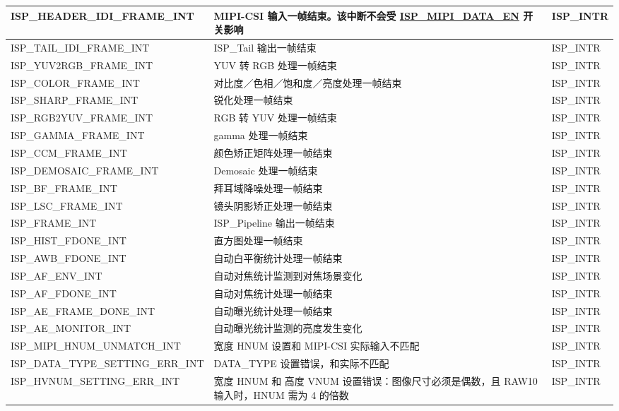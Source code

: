 \documentclass[main\_\_CN.tex]{subfiles}
\begin{document}
\begin{longtable}{ | L{5.6cm} | L{5.8cm} | L{3cm} | }
    ISP\_HEADER\_IDI\_FRAME\_INT & MIPI-CSI 输入一帧结束。该中断不会受 \hyperref[fielddesc:ISPMIPIDATAEN]{ISP\_MIPI\_DATA\_EN} 开关影响 & ISP\_INTR \\ \hline
    ISP\_TAIL\_IDI\_FRAME\_INT & ISP\_Tail 输出一帧结束 & ISP\_INTR \\ \hline
    ISP\_YUV2RGB\_FRAME\_INT & YUV 转 RGB 处理一帧结束 & ISP\_INTR \\ \hline
    ISP\_COLOR\_FRAME\_INT & 对比度／色相／饱和度／亮度处理一帧结束 & ISP\_INTR \\ \hline
    ISP\_SHARP\_FRAME\_INT & 锐化处理一帧结束 & ISP\_INTR \\ \hline
    ISP\_RGB2YUV\_FRAME\_INT & RGB 转 YUV 处理一帧结束 & ISP\_INTR \\ \hline
    ISP\_GAMMA\_FRAME\_INT & gamma 处理一帧结束 & ISP\_INTR \\ \hline
    ISP\_CCM\_FRAME\_INT & 颜色矫正矩阵处理一帧结束 & ISP\_INTR \\ \hline
    ISP\_DEMOSAIC\_FRAME\_INT & Demosaic 处理一帧结束 & ISP\_INTR \\ \hline
    ISP\_BF\_FRAME\_INT & 拜耳域降噪处理一帧结束 & ISP\_INTR \\ \hline
    ISP\_LSC\_FRAME\_INT & 镜头阴影矫正处理一帧结束 & ISP\_INTR \\ \hline
    ISP\_FRAME\_INT & ISP\_Pipeline 输出一帧结束 & ISP\_INTR \\ \hline
    ISP\_HIST\_FDONE\_INT & 直方图处理一帧结束 & ISP\_INTR \\ \hline
    ISP\_AWB\_FDONE\_INT & 自动白平衡统计处理一帧结束 & ISP\_INTR \\ \hline
    ISP\_AF\_ENV\_INT & 自动对焦统计监测到对焦场景变化 & ISP\_INTR \\ \hline
    ISP\_AF\_FDONE\_INT & 自动对焦统计处理一帧结束 & ISP\_INTR \\ \hline
    ISP\_AE\_FRAME\_DONE\_INT & 自动曝光统计处理一帧结束 & ISP\_INTR \\ \hline
    ISP\_AE\_MONITOR\_INT & 自动曝光统计监测的亮度发生变化 & ISP\_INTR \\ \hline
    ISP\_MIPI\_HNUM\_UNMATCH\_INT & 宽度 HNUM 设置和 MIPI-CSI 实际输入不匹配 & ISP\_INTR \\ \hline
    ISP\_DATA\_TYPE\_SETTING\_ERR\_INT & DATA\_TYPE 设置错误，和实际不匹配 & ISP\_INTR \\ \hline
    ISP\_HVNUM\_SETTING\_ERR\_INT & 宽度 HNUM 和 高度 VNUM 设置错误：图像尺寸必须是偶数，且 RAW10 输入时，HNUM 需为 4 的倍数 & ISP\_INTR \\ \hline

\end{longtable}
\end{document}
